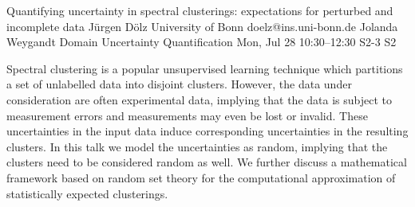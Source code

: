 \begin{talk}
\end{talk}

\begin{talk}
  {Quantifying uncertainty in spectral clusterings: expectations for perturbed and incomplete data}%
  {J\"urgen D\"olz}%
  {University of Bonn}%
  {doelz@ins.uni-bonn.de}%
  {Jolanda Weygandt}%
  {Domain Uncertainty Quantification}%
  {Mon, Jul 28 10:30–12:30}%
  {S2-3}%
  {S2}%
				
			
Spectral clustering is a popular unsupervised learning technique which partitions a set of unlabelled data into disjoint clusters. However, the data under consideration are often experimental data, implying that the data is subject to measurement errors and measurements may even be lost or invalid. These uncertainties in the input data induce corresponding uncertainties in the resulting clusters. In this talk we model the uncertainties as random, implying that the clusters need to be considered random as well. We further discuss a mathematical framework based on random set theory for the computational approximation of statistically expected clusterings.
\end{talk}

